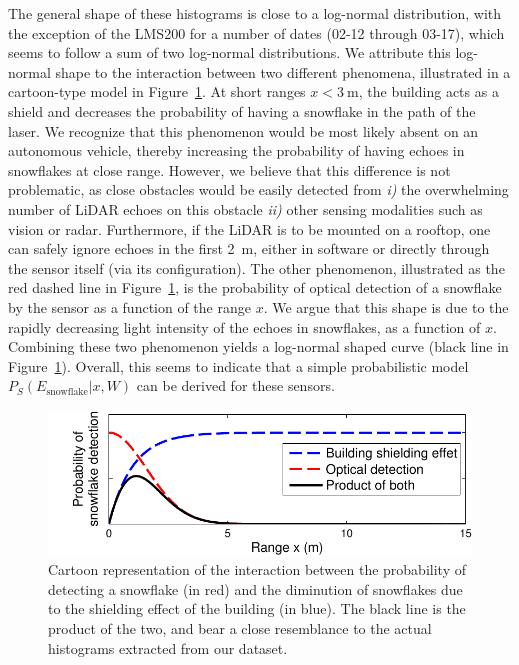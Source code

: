 The general shape of these histograms is close to a log-normal distribution, with the exception of the LMS200 for a number of dates (02-12 through 03-17), which seems to follow a sum of two log-normal distributions. We attribute this log-normal shape to the interaction between two different phenomena, illustrated in a cartoon-type model in Figure~\ref{fig:CartoonModel}. At short ranges $x<\SI{3}{\meter}$, the building acts as a shield and decreases the probability of having a snowflake in the path of the laser. We recognize that this phenomenon would be most likely absent on an autonomous vehicle, thereby increasing the probability of having echoes in snowflakes at close range. However, we believe that this difference is not problematic, as close obstacles would be easily detected from \emph{i)} the overwhelming number of  LiDAR echoes on this obstacle \emph{ii)} other sensing modalities such as vision or radar. Furthermore, if the LiDAR is to be mounted on a rooftop, one can safely  ignore echoes in the first \SI{2}{\meter}, either in software or directly through the sensor itself (via its configuration). The other phenomenon, illustrated as the red dashed line in Figure~\ref{fig:CartoonModel}, is the probability of optical detection of a snowflake by the sensor as a function of the range $x$. We argue that this shape is due to the rapidly decreasing light intensity of the echoes in snowflakes, as a function of $x$. Combining these two phenomenon yields a log-normal shaped curve (black line in Figure~\ref{fig:CartoonModel}). Overall, this seems to indicate that a simple probabilistic model $P_S(E_\text{snowflake}|x,W)$ can be derived for these sensors.

\begin{figure}[h]
    \centering
    \includegraphics[trim={0.6cm 0 0 0},clip,width=0.7\linewidth]{./img/chap_lidar/ShieldingModel.pdf}
    \caption{Cartoon representation of the interaction between the probability of detecting a snowflake (in red) and the diminution of snowflakes due to the shielding effect of the building (in blue). The black line is the product of the two, and bear a close resemblance to the actual histograms extracted from our dataset.}
    \label{fig:CartoonModel}
\end{figure}


